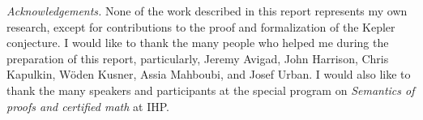 \documentclass[brochure,english,12pt]{bourbaki}
\theoremstyle{plain}
\begin{document}
\bigskip


{\it Acknowledgements.}  None of the work described in this report represents my own research, except for contributions to the
proof and formalization of the Kepler conjecture.  I would like to thank the many people who helped me
during the preparation of this report, particularly, Jeremy Avigad, John Harrison, Chris Kapulkin, 
W\"oden Kusner, Assia Mahboubi, and Josef Urban.
I would also like to thank the many speakers and participants at the special program on {\it Semantics of proofs and certified 
math} at IHP.




\raggedright
%

\end{document}
